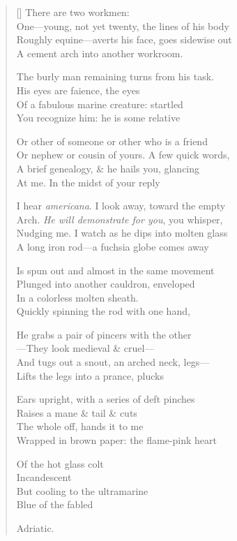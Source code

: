 \label{ch:murano}
\settowidth{\versewidth}{Roughly equine—averts his face, goes sidewise out}
\begin{verse}[\versewidth]
There are two workmen:\\
One---young, not yet twenty, the lines of his body\\
Roughly equine---averts his face, goes sidewise out\\
A cement arch into another workroom.

The burly man remaining turns from his task.\\
His eyes are faience, the eyes\\
Of a fabulous marine creature: startled\\
You recognize him: he is some relative

Or other of someone or other who is a friend\\
Or nephew or cousin of yours. A few quick words,\\
A brief genealogy, \& he hails you, glancing\\
At me. In the midst of your reply

I hear \textit{americana}. I look away, toward the empty\\
Arch. \textit{He will demonstrate for you}, you whisper,\\
Nudging me. I watch as he dips into molten glass\\
A long iron rod---a fuchsia globe comes away

Is spun out and almost in the same movement\\
Plunged into another cauldron, enveloped\\
In a colorless molten sheath.\\
Quickly spinning the rod with one hand,

He grabs a pair of pincers with the other\\
---They look medieval \& cruel---\\
And tugs out a snout, an arched neck, legs---\\
Lifts the legs into a prance, plucks

Ears upright, with a series of deft pinches\\
Raises a mane \& tail \& cuts\\
The whole off, hands it to me\\
Wrapped in brown paper: the flame-pink heart

Of the hot glass colt\\
Incandescent\\
But cooling to the ultramarine\\
Blue of the fabled

Adriatic.
\end{verse}
